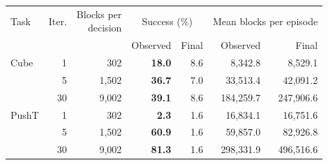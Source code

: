 \begingroup
\normalsize
\setlength{\tabcolsep}{4pt}
\begin{tabular}{@{}lrrrrrr@{}}
\toprule
Task & Iter. & \shortstack{Blocks per\\decision} & \multicolumn{2}{c}{Success (\%)} & \multicolumn{2}{c}{Mean blocks per episode} \\
\cmidrule(lr){4-5}\cmidrule(lr){6-7}
 & & & Observed & Final & Observed & Final \\
\midrule
Cube & 1 & 302 & \textbf{18.0} & 8.6 & 8,342.8 & 8,529.1 \\
 & 5 & 1,502 & \textbf{36.7} & 7.0 & 33,513.4 & 42,091.2 \\
 & 30 & 9,002 & \textbf{39.1} & 8.6 & 184,259.7 & 247,906.6 \\
\midrule
PushT & 1 & 302 & \textbf{2.3} & 1.6 & 16,834.1 & 16,751.6 \\
 & 5 & 1,502 & \textbf{60.9} & 1.6 & 59,857.0 & 82,926.8 \\
 & 30 & 9,002 & \textbf{81.3} & 1.6 & 298,331.9 & 496,516.6 \\
\bottomrule
\end{tabular}
\endgroup
